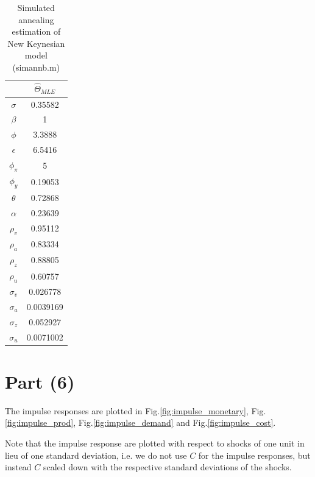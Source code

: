 \documentclass[12pt]{article}
\theoremstyle{definition}
\begin{document}
\begin{table}[H]
	\centering
	\begin{tabular}{c|c}
		\hline
		& $\hat{\Theta}_{MLE}$\\
		\hline 
$\sigma $ &     0.35582\\
$\beta $   &  1\\
$\phi $     &       3.3888\\
$\epsilon$  &       6.5416\\
$\phi_\pi$  &         5\\
$\phi_y $  &   0.19053\\
$\theta$   &   0.72868\\
$\alpha $ & 0.23639\\
$\rho_v$   &  0.95112\\
$\rho_a$   &   0.83334\\
$\rho_z$   &    0.88805\\
$\rho_u$  &    0.60757\\
$\sigma_v$ &  0.026778\\
$\sigma_a$ & 0.0039169\\
$\sigma_z$ &  0.052927\\
$\sigma_u$ &   0.0071002\\
\hline 
	\end{tabular}
	\caption{Simulated annealing estimation of New Keynesian model (simannb.m)}
	\label{tab:sa2}
\end{table}


\section*{Part (6)}

The impulse responses are plotted in Fig.\ref{fig:impulse_monetary}, Fig.\ref{fig:impulse_prod}, Fig.\ref{fig:impulse_demand} and Fig.\ref{fig:impulse_cost}.

Note that the impulse response are plotted with respect to shocks of one unit in lieu of one standard deviation, i.e. we do not use $C$ for the impulse responses, but instead $C$ scaled down with the respective standard deviations of the shocks.
\end{document}
